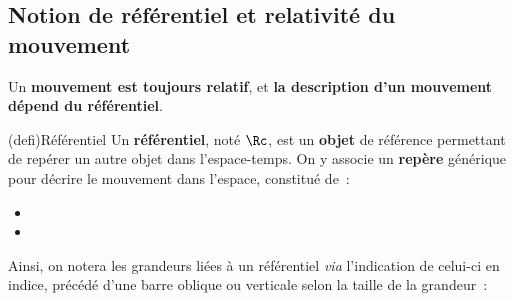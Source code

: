 \documentclass[../../main/main.tex]{subfiles}
\begin{document}
\subsection{Notion de référentiel et relativité du mouvement}


Un \textbf{mouvement est toujours relatif}, et \textbf{la description
	d'un mouvement dépend du référentiel}.

\begin{tcb*}(defi){Référentiel}
	Un \textbf{référentiel}, noté $\Rc$, est un \textbf{objet} de référence
	permettant de repérer un autre objet dans l'espace-temps. On y
	associe un \textbf{repère} générique pour décrire le mouvement dans l'espace,
	constitué de~:
	\begin{itemize}
		\item {}
		\item {}
	\end{itemize}
	\smallbreak
	Ainsi, on notera les grandeurs liées à un
	référentiel \textit{via} l'indication de celui-ci en indice, précédé d'une barre
	oblique ou verticale selon la taille de la grandeur~:
	\vspace{-15pt}
\end{tcb*}
\end{document}

